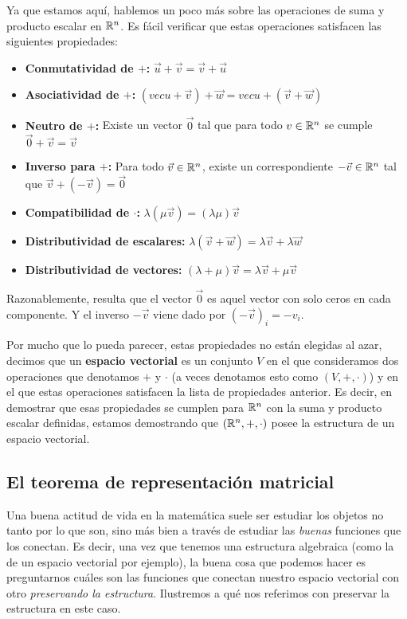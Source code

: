 Ya que estamos aquí, hablemos un poco más sobre las operaciones de suma y producto escalar en $\mathbb{R}^n$. Es fácil verificar que estas operaciones satisfacen las siguientes propiedades:
\begin{itemize}
    \item \textbf{Conmutatividad de $+$:} $\vec{u} + \vec{v} = \vec{v} + \vec{u}$
    \item \textbf{Asociatividad de $+$:} $(vec{u} + \vec{v}) + \vec{w} = vec{u} + (\vec{v} + \vec{w})$
    \item \textbf{Neutro de $+$:} Existe un vector $\vec{0}$ tal que para todo $v \in \mathbb{R}^n$ se cumple $\vec{0} + \vec{v} = \vec{v}$
    \item \textbf{Inverso para $+$:} Para todo $\vec{v} \in \mathbb{R}^n$, existe un correspondiente $-\vec{v} \in \mathbb{R}^n$ tal que $\vec{v} + (-\vec{v}) = \vec{0}$
    \item \textbf{Compatibilidad de $\cdot$:} $\lambda(\mu \vec{v}) = (\lambda \mu) \vec{v}$
    \item \textbf{Distributividad de escalares:} $\lambda(\vec{v} + \vec{w}) = \lambda\vec{v} + \lambda \vec{w}$
    \item \textbf{Distributividad de vectores:} $(\lambda + \mu)\vec{v} = \lambda \vec{v} + \mu \vec{v}$
\end{itemize}

Razonablemente, resulta que el vector $\vec{0}$ es aquel vector con solo ceros en cada componente. Y el inverso $-\vec{v}$ viene dado por $(-\vec{v})_i = -v_i$.

Por mucho que lo pueda parecer, estas propiedades no están elegidas al azar, decimos que un \textbf{espacio vectorial} es un conjunto $V$ en el que consideramos dos operaciones que denotamos $+$ y $\cdot$ (a veces denotamos esto como $(V, +, \cdot)$) y en el que estas operaciones satisfacen la lista de propiedades anterior. Es decir, en demostrar que esas propiedades se cumplen para $\mathbb{R}^n$ con la suma y producto escalar definidas, estamos demostrando que $(\mathbb{R}^n, +, \cdot)$ posee la estructura de un espacio vectorial.

\subsection{El teorema de representación matricial}

Una buena actitud de vida en la matemática suele ser estudiar los objetos no tanto por lo que son, sino más bien a través de estudiar las \textit{buenas} funciones que los conectan. Es decir, una vez que tenemos una estructura algebraica (como la de un espacio vectorial por ejemplo), la buena cosa que podemos hacer es preguntarnos cuáles son las funciones que conectan nuestro espacio vectorial con otro \textit{preservando la estructura}. Ilustremos a qué nos referimos con preservar la estructura en este caso.

